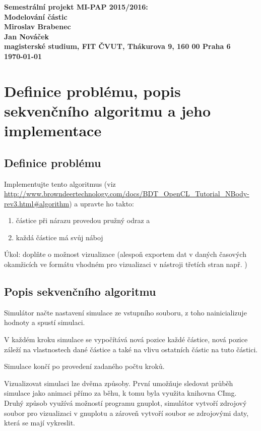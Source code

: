 \documentclass[12pt]{article}
\begin{document}
\begin{center}
\bf Semestrální projekt MI-PAP 2015/2016:\\[5mm]
    Modelování částic\\[5mm]
       Miroslav Brabenec\\
       Jan Nováček\\[2mm]
magisterské studium, FIT ČVUT, Thákurova 9, 160 00 Praha 6\\[2mm]
\today
\end{center}
%
%
%
%
%
\section{Definice problému, popis sekvenčního algoritmu a jeho implementace}

\subsection{Definice problému}
Implementujte tento algoritmus (viz \url{http://www.browndeertechnology.com/docs/BDT_OpenCL_Tutorial_NBody-rev3.html#algorithm}) a upravte ho takto:

\begin{enumerate}
\item	částice při nárazu provedou pružný odraz a
\item	každá částice má svůj náboj
\end{enumerate}

Úkol: doplňte o možnost vizualizace (alespoň exportem dat v daných časových okamžicích ve formátu vhodném pro vizualizaci v nástroji třetích stran např. ) 

\subsection{Popis sekvenčního algoritmu}
Simulátor načte nastavení simulace ze vstupního souboru, z toho nainicializuje hodnoty a spustí simulaci.

V každém kroku simulace se vypočítává nová pozice každé částice, nová pozice záleží na vlastnostech dané částice a také na vlivu ostatních částic na tuto částici.

Simulace končí po provedení zadaného počtu kroků.

Vizualizovat simulaci lze dvěma způsoby.
První umožňuje sledovat průběh simulace jako animaci přímo za běhu, k tomu byla využita knihovna CImg.
Druhý způsob využívá možností programu gnuplot,
simulátor vytvoří zdrojový soubor pro vizualizaci v gnuplotu a zároveň vytvoří soubor se zdrojovými daty, která se mají vykreslit.
\end{document}
